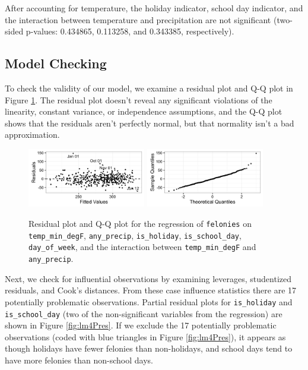 \documentclass[11pt,notitlepage]{article}
\begin{document}
After accounting for temperature, the holiday indicator, school day indicator, and the interaction between temperature and precipitation are not significant (two-sided p-values: 0.434865, 0.113258, and 0.343385, respectively).

\subsection{Model Checking}

To check the validity of our model, we examine a residual plot and Q-Q plot in Figure \ref{fig:lm4ResidualsQQ}. The residual plot doesn't reveal any significant violations of the linearity, constant variance, or independence assumptions, and the Q-Q plot shows that the residuals aren't perfectly normal, but that normality isn't a bad approximation.

\begin{figure}[!h]
  \centering
  \captionsetup{width=0.8\textwidth}
  \subfloat%
  		{\includegraphics[width=0.46\textwidth]
  		{figures/lm4Residuals.png}\label{fig:lm4Residuals}}
  \hfill
  \subfloat%
  		{\includegraphics[width=0.46\textwidth]
  		{figures/lm4QQ.png}\label{fig:lm4QQ}}
  \caption{Residual plot and Q-Q plot for the regression of \texttt{felonies} on \texttt{temp_min_degF}, \texttt{any_precip}, \texttt{is_holiday}, \texttt{is_school_day}, \texttt{day_of_week}, and the interaction between \texttt{temp_min_degF} and \texttt{any_precip}.}
  \label{fig:lm4ResidualsQQ}
\end{figure}

Next, we check for influential observations by examining leverages, studentized residuals, and Cook's distances. From these case influence statistics there are 17 potentially problematic observations. Partial residual plots for \texttt{is_holiday} and \texttt{is_school_day} (two of the non-significant variables from the regression) are shown in Figure \ref{fig:lm4Pres}. If we exclude the 17 potentially problematic observations (coded with blue triangles in Figure \ref{fig:lm4Pres}), it appears as though holidays have fewer felonies than non-holidays, and school days tend to have more felonies than non-school days.
\end{document}
